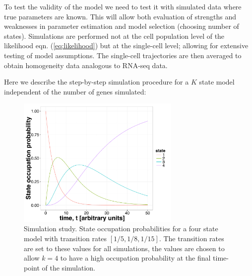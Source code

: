 To test the validity of the model we need to test it with simulated data where true parameters are known. This will allow both evaluation of strengths and weaknesses in parameter estimation and model selection (choosing number of states). Simulations are performed not at the cell population level of the likelihood eqn. (\ref{eq:likelihood}) but at the single-cell level; allowing for extensive testing of model assumptions. The single-cell trajectories are then averaged to obtain homogeneity data analogous to RNA-seq data.

Here we describe the step-by-step simulation procedure for a $K$ state model independent of the number of genes simulated:

\begin{figure}
  \centering
  \includegraphics[width=0.7\textwidth]{pics/trans-rates.pdf}
  \caption{Simulation study. State occupation probabilities for a four state model with transition rates $[1/5, 1/8, 1/15]$.  The transition rates are set to these values for all simulations, the values are chosen to allow $k=4$ to have a high occupation probability at the final time-point of the simulation.}
  \label{fig:transition-rates}
\end{figure}

